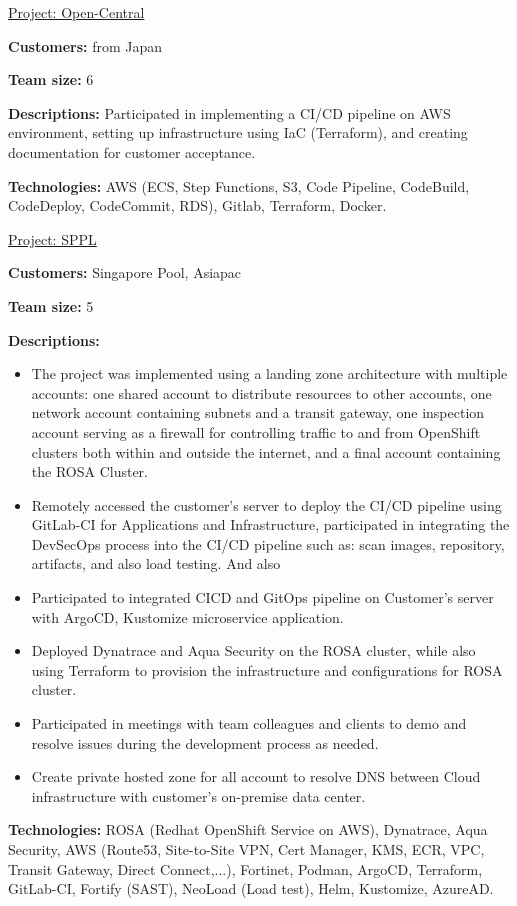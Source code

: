 \documentclass[letterpaper,10pt]{article}
\newenvironment{resume_list}{
  \vspace{-7pt}
  \begin{itemize}[itemsep=-2px, parsep=1pt, leftmargin=30pt]
}{
  \end{itemize}
}
\newcommand{\itemTitle}[1]{
  \item[] \underline{#1}\vspace{4pt}
}
\begin{document}
\begin{resume_list}
    \itemTitle{Project: Open-Central}
    \item \textbf{Customers:} from Japan
    \item \textbf{Team size:} 6
    \item \textbf{Descriptions:} Participated in implementing a CI/CD pipeline on AWS environment, setting up infrastructure using IaC (Terraform), and creating documentation for customer acceptance.
    \item \textbf{Technologies:} AWS (ECS, Step Functions, S3, Code Pipeline, CodeBuild, CodeDeploy, CodeCommit, RDS), Gitlab, Terraform, Docker.
\end{resume_list}

\begin{resume_list}
    \itemTitle{Project: SPPL}
    \item \textbf{Customers:} Singapore Pool, Asiapac
    \item \textbf{Team size:} 5
    \item \textbf{Descriptions:}
    \begin{itemize}
        \item The project was implemented using a landing zone architecture with multiple accounts: one shared account to distribute resources to other accounts, one network account containing subnets and a transit gateway, one inspection account serving as a firewall for controlling traffic to and from OpenShift clusters both within and outside the internet, and a final account containing the ROSA Cluster.
        \item Remotely accessed the customer's server to deploy the CI/CD pipeline using GitLab-CI for Applications and Infrastructure, participated in integrating the DevSecOps process into the CI/CD pipeline such as: scan images, repository, artifacts, and also load testing. And also 
        \item Participated to integrated CICD and GitOps pipeline on Customer's server with ArgoCD, Kustomize microservice application.
        \item Deployed Dynatrace and Aqua Security on the ROSA cluster, while also using Terraform to provision the infrastructure and configurations for ROSA cluster.
        \item Participated in meetings with team colleagues and clients to demo and resolve issues during the development process as needed.
        \item Create private hosted zone for all account to resolve DNS between Cloud infrastructure with customer's on-premise data center.
    \end{itemize}
    \item \textbf{Technologies:} ROSA (Redhat OpenShift Service on AWS), Dynatrace, Aqua Security, AWS (Route53, Site-to-Site VPN, Cert Manager, KMS, ECR, VPC, Transit Gateway, Direct Connect,...), Fortinet, Podman, ArgoCD, Terraform, GitLab-CI, Fortify (SAST), NeoLoad (Load test), Helm, Kustomize, AzureAD.
\end{resume_list}
\end{document}
